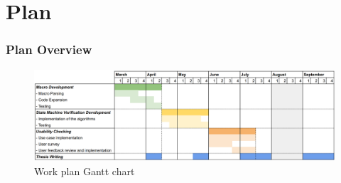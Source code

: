 \documentclass[bigger,notes]{beamer}
\begin{document}
\section{Plan}

\begin{frame}
    \frametitle{Plan Overview}

    \begin{figure}[h]
        \centering
        \includegraphics[width=\linewidth]{planning.png}
        \caption{Work plan Gantt chart}
    \end{figure}

\end{frame}
\end{document}

